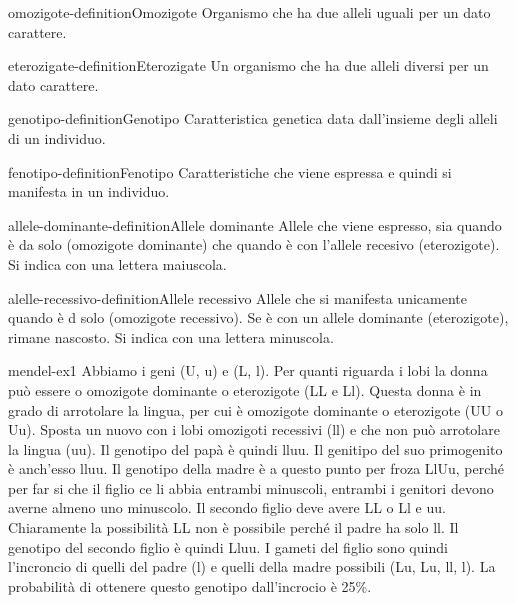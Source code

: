 \documentclass[preview]{standalone}
\begin{document}
\begin{snippetdefinition}{omozigote-definition}{Omozigote}
    Organismo che ha due alleli uguali per un dato carattere.
\end{snippetdefinition}

\begin{snippetdefinition}{eterozigate-definition}{Eterozigate}
    Un organismo che ha due alleli diversi per un dato carattere.
\end{snippetdefinition}

\begin{snippetdefinition}{genotipo-definition}{Genotipo}
    Caratteristica genetica data dall'insieme degli alleli di un individuo.
\end{snippetdefinition}

\begin{snippetdefinition}{fenotipo-definition}{Fenotipo}
    Caratteristiche che viene espressa e quindi si manifesta in un individuo.
\end{snippetdefinition}

\begin{snippetdefinition}{allele-dominante-definition}{Allele dominante}
    Allele che viene espresso, sia quando è da solo (omozigote dominante) che
    quando è con l'allele recesivo (eterozigote). Si indica con una lettera maiuscola.
\end{snippetdefinition}

\begin{snippetdefinition}{alelle-recessivo-definition}{Allele recessivo}
    Allele che si manifesta unicamente quando è d solo (omozigote recessivo).
    Se è con un allele dominante (eterozigote), rimane nascosto. Si indica con una lettera minuscola.
\end{snippetdefinition}


\begin{snippetexercise}{mendel-ex1}{}
    Abbiamo i geni (U, u) e (L, l).
    Per quanti riguarda i lobi la donna può essere o omozigote dominante o eterozigote
    (LL e Ll). Questa donna è in grado di arrotolare la lingua, per cui è
    omozigote dominante o eterozigote (UU o Uu).
    Sposta un nuovo con i lobi omozigoti recessivi (ll) e che non può arrotolare la lingua
    (uu). Il genotipo del papà è quindi lluu. Il genitipo del suo primogenito 
    è anch'esso lluu.
    Il genotipo della madre è a questo punto per froza LlUu, perché
    per far si che il figlio ce li abbia entrambi minuscoli, entrambi
    i genitori devono averne almeno uno minuscolo.
    Il secondo figlio deve avere LL o Ll e uu. Chiaramente la possibilità
    LL non è possibile perché il padre ha solo ll.
    Il genotipo del secondo figlio è quindi Lluu.
    I gameti del figlio sono quindi l'incroncio di quelli del padre (l)
    e quelli della madre possibili (Lu, Lu, ll, l).
    La probabilità di ottenere questo genotipo dall'incrocio è 25\%.
\end{snippetexercise}
\end{document}
